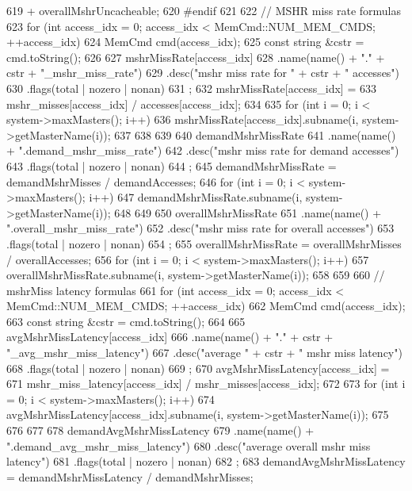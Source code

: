 \begin{DoxyCode}
{619         + overallMshrUncacheable;
620 #endif
621 
622     // MSHR miss rate formulas
623     for (int access_idx = 0; access_idx < MemCmd::NUM_MEM_CMDS; ++access_idx) {
624         MemCmd cmd(access_idx);
625         const string &cstr = cmd.toString();
626 
627         mshrMissRate[access_idx]
628             .name(name() + "." + cstr + "_mshr_miss_rate")
629             .desc("mshr miss rate for " + cstr + " accesses")
630             .flags(total | nozero | nonan)
631             ;
632         mshrMissRate[access_idx] =
633             mshr_misses[access_idx] / accesses[access_idx];
634 
635         for (int i = 0; i < system->maxMasters(); i++) {
636             mshrMissRate[access_idx].subname(i, system->getMasterName(i));
637         }
638     }
639 
640     demandMshrMissRate
641         .name(name() + ".demand_mshr_miss_rate")
642         .desc("mshr miss rate for demand accesses")
643         .flags(total | nozero | nonan)
644         ;
645     demandMshrMissRate = demandMshrMisses / demandAccesses;
646     for (int i = 0; i < system->maxMasters(); i++) {
647         demandMshrMissRate.subname(i, system->getMasterName(i));
648     }
649 
650     overallMshrMissRate
651         .name(name() + ".overall_mshr_miss_rate")
652         .desc("mshr miss rate for overall accesses")
653         .flags(total | nozero | nonan)
654         ;
655     overallMshrMissRate = overallMshrMisses / overallAccesses;
656     for (int i = 0; i < system->maxMasters(); i++) {
657         overallMshrMissRate.subname(i, system->getMasterName(i));
658     }
659 
660     // mshrMiss latency formulas
661     for (int access_idx = 0; access_idx < MemCmd::NUM_MEM_CMDS; ++access_idx) {
662         MemCmd cmd(access_idx);
663         const string &cstr = cmd.toString();
664 
665         avgMshrMissLatency[access_idx]
666             .name(name() + "." + cstr + "_avg_mshr_miss_latency")
667             .desc("average " + cstr + " mshr miss latency")
668             .flags(total | nozero | nonan)
669             ;
670         avgMshrMissLatency[access_idx] =
671             mshr_miss_latency[access_idx] / mshr_misses[access_idx];
672 
673         for (int i = 0; i < system->maxMasters(); i++) {
674             avgMshrMissLatency[access_idx].subname(i, system->getMasterName(i));
675         }
676     }
677 
678     demandAvgMshrMissLatency
679         .name(name() + ".demand_avg_mshr_miss_latency")
680         .desc("average overall mshr miss latency")
681         .flags(total | nozero | nonan)
682         ;
683     demandAvgMshrMissLatency = demandMshrMissLatency / demandMshrMisses;
}
\end{DoxyCode}
